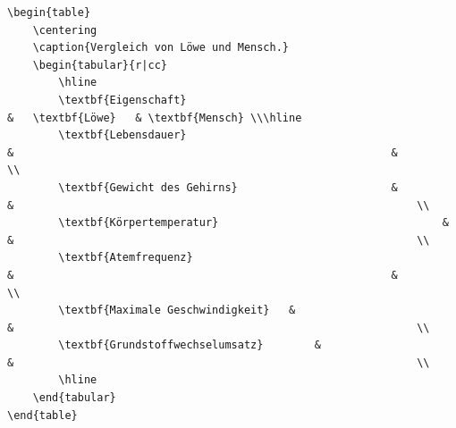 \begin{frame}[fragile]
	\Code
	\begin{lstlisting}[tabsize=1]
\begin{table}
	\centering
	\caption{Vergleich von Löwe und Mensch.}
	\begin{tabular}{r|cc}
		\hline
		\textbf{Eigenschaft}														&	\textbf{Löwe}	& \textbf{Mensch} \\\hline
		\textbf{Lebensdauer} 													&															& 																\\
		\textbf{Gewicht des Gehirns}						&															& 																\\ 
		\textbf{Körpertemperatur}									&															& 																\\
		\textbf{Atemfrequenz}													&															& 																\\
		\textbf{Maximale Geschwindigkeit}	&															& 																\\ 
		\textbf{Grundstoffwechselumsatz}		&															& 																\\
		\hline
	\end{tabular}
\end{table}
	\end{lstlisting}
\end{frame}
